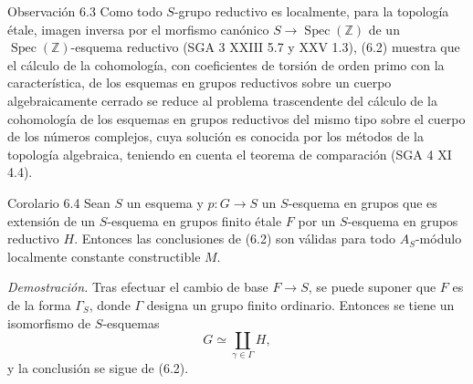 \begin{statement}{Observación 6.3}
Como todo $S$-grupo reductivo es localmente, para la topología étale, imagen inversa por el morfismo canónico $S\to\operatorname{Spec}(\mathbb Z)$ de un $\operatorname{Spec}(\mathbb Z)$-esquema reductivo (SGA 3 XXIII 5.7 y XXV 1.3), (6.2) muestra que el cálculo de la cohomología, con coeficientes de torsión de orden primo con la característica, de los esquemas en grupos reductivos sobre un cuerpo algebraicamente cerrado se reduce al problema trascendente del cálculo de la cohomología de los esquemas en grupos reductivos del mismo tipo sobre el cuerpo de los números complejos, cuya solución es conocida por los métodos de la topología algebraica, teniendo en cuenta el teorema de comparación (SGA 4 XI 4.4).
\end{statement}

\begin{statement}{Corolario 6.4}
Sean $S$ un esquema y $p:G\to S$ un $S$-esquema en grupos que es extensión de un $S$-esquema en grupos finito étale $F$ por un $S$-esquema en grupos reductivo $H$. Entonces las conclusiones de (6.2) son válidas para todo $A_S$-módulo localmente constante constructible $M$.
\end{statement}

\emph{Demostración.} Tras efectuar el cambio de base $F\to S$, se puede suponer que $F$ es de la forma $\Gamma_S$, donde $\Gamma$ designa un grupo finito ordinario. Entonces se tiene un isomorfismo de $S$-esquemas
\[
G\simeq\coprod_{\gamma\in\Gamma}H,
\]
y la conclusión se sigue de (6.2).
